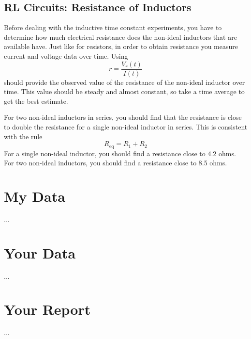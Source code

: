 \subsection{RL Circuits: Resistance of Inductors}
Before dealing with the inductive time constant experiments, you have to determine how much electrical resistance does the non-ideal inductors that are available have. Just like for resistors, in order to obtain resistance you measure current and voltage data over time. Using
\begin{equation}
    r = \frac{V_{r}(t)}{I(t)}
\end{equation}
should provide the observed value of the resistance of the non-ideal inductor over time. This value should be steady and almost constant, so take a time average to get the best estimate.

For two non-ideal inductors in series, you should find that the resistance is close to double the resistance for a single non-ideal inductor in series. This is consistent with the rule
\begin{equation}
    R_{\text{eq}} = R_{1} + R_{2}
\end{equation}
For a single non-ideal inductor, you should find a resistance close to 4.2 ohms. For two non-ideal inductors, you should find a resistance close to 8.5 ohms.
\section{My Data}
...
\section{Your Data}
...
\newpage
\section{Your Report}
...
\newpage
